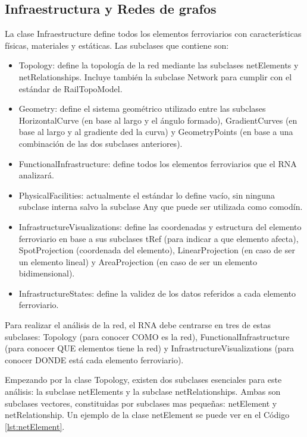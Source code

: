 \subsection{Infraestructura y Redes de grafos}
    \label{sec:grafos}

    La clase Infraestructure define todos los elementos ferroviarios con características físicas, materiales y estáticas. Las subclases que contiene son:

    \begin{itemize}
        \item Topology: define la topología de la red mediante las subclases netElements y netRelationships. Incluye también la subclase Network para cumplir con el estándar de RailTopoModel.
        \item Geometry: define el sistema geométrico utilizado entre las subclases HorizontalCurve (en base al largo y el ángulo formado), GradientCurves (en base al largo y al gradiente ded la curva) y GeometryPoints (en base a una combinación de las dos subclases anteriores).
        \item FunctionalInfrastructure: define todos los elementos ferroviarios que el RNA analizará.
        \item PhysicalFacilities: actualmente el estándar lo define vacío, sin ninguna subclase interna salvo la subclase Any que puede ser utilizada como comodín.
        \item InfrastructureVisualizations: define las coordenadas y estructura del elemento ferroviario en base a sus subclases tRef (para indicar a que elemento afecta), SpotProjection (coordenada del elemento), LinearProjection (en caso de ser un elemento lineal) y AreaProjection (en caso de ser un elemento bidimensional).
        \item InfrastructureStates: define la validez de los datos referidos a cada elemento ferroviario.
    \end{itemize}

    Para realizar el análisis de la red, el RNA debe centrarse en tres de estas subclases: Topology (para conocer COMO es la red), FunctionalInfrastructure (para conocer QUE elementos tiene la red) y InfrastructureVisualizations (para conocer DONDE está cada elemento ferroviario).

    Empezando por la clase Topology, existen dos subclases esenciales para este análisis: la subclase netElements y la subclase netRelationships. Ambas son subclases vectores, constituidas por subclases mas pequeñas: netElement y netRelationship. Un ejemplo de la clase netElement se puede ver en el Código \ref{lst:netElement}.
    
